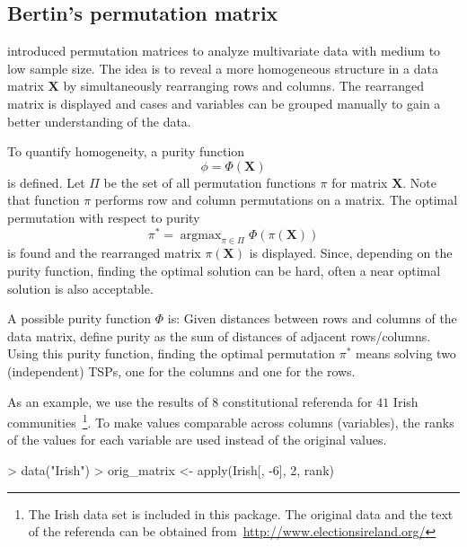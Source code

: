 \documentclass[fleqn, a4paper]{article}
\DeclareMathOperator*{\argmax}{argmax}
\begin{document}
\subsection{Bertin's permutation matrix}

\cite{seriation:Bertin:1981,seriation:Bertin:1999} 
introduced permutation matrices to analyze
multivariate data with medium to low sample size.  The idea is to reveal a more
homogeneous structure in a data matrix $\mathbf{X}$ by simultaneously
rearranging rows and columns. The rearranged matrix is displayed and cases and
variables can be grouped manually to gain a better understanding of the data.

To quantify homogeneity, a purity function
\begin{displaymath}
  \phi = \Phi(\mathbf{X})  
\end{displaymath}
is defined. Let $\Pi$ be the set of all permutation functions
$\pi$ for matrix $\mathbf{X}$.
Note that function $\pi$ performs row and column permutations on a matrix.
The optimal permutation with respect to
purity
\begin{displaymath}
  \pi^* = \argmax\nolimits_{\pi \in \Pi} \Phi(\pi(\mathbf{X}))  
\end{displaymath}
is found and the rearranged matrix $\pi(\mathbf{X})$ is
displayed. Since, depending on the purity function, finding the optimal
solution can be hard, often a near optimal solution is also acceptable.

A possible purity function $\Phi$ is:
Given distances between rows and columns of the data matrix, define purity as
the sum of distances of adjacent rows/columns.  Using this purity function,
finding the optimal permutation $\pi^*$ means solving two (independent) TSPs,
one for the columns and one for the rows.

As an example, we use the results of $8$ constitutional referenda for $41$
Irish communities~\citep{seriation:Falguerolles:1997}\footnote{The Irish data
set is included in this package. The original data and the text of the
referenda can be obtained from~\url{http://www.electionsireland.org/}}.  To
make values comparable across columns (variables), the ranks of the values for
each variable are used instead of the original values.  

\begin{Schunk}
\begin{Sinput}
> data("Irish")
> orig_matrix <- apply(Irish[, -6], 2, rank)
\end{Sinput}
\end{Schunk}
\end{document}
